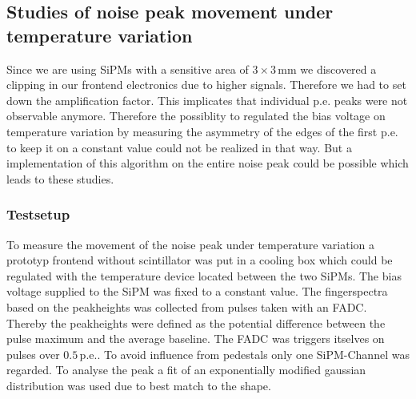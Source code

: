 \subsection{Studies of noise peak movement under temperature variation}
Since we are using SiPMs with a sensitive area of $3\times3\,\mathrm{mm}$ we discovered a clipping in our frontend electronics due to higher signals. Therefore we had to set down the amplification factor. This implicates that individual p.e. peaks were not observable anymore. Therefore the possiblity to regulated the bias voltage on temperature variation by measuring the asymmetry of the edges of the first p.e. to keep it on a constant value could not be realized in that way. But a implementation of this algorithm on the entire noise peak could be possible which leads to these studies.

\subsubsection{Testsetup}
To measure the movement of the noise peak under temperature variation a prototyp frontend without scintillator was put in a cooling box which could be regulated with the temperature device located between the two SiPMs. The bias voltage supplied to the SiPM was fixed to a constant value. The fingerspectra based on the peakheights was collected from pulses taken with an FADC. Thereby the peakheights were defined as the potential difference between the pulse maximum and the average baseline. The FADC was triggers itselves on pulses over $0.5\,\mathrm{p.e.}$. To avoid influence from pedestals only one SiPM-Channel was regarded. To analyse the peak a fit of an exponentially modified gaussian distribution was used due to best match to the shape.

